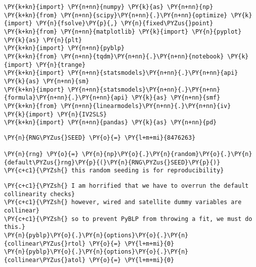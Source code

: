 
    \begin{tcolorbox}[breakable, size=fbox, boxrule=1pt, pad at break*=1mm,colback=cellbackground, colframe=cellborder]
\begin{Verbatim}[commandchars=\\\{\}]
\PY{k+kn}{import} \PY{n+nn}{numpy} \PY{k}{as} \PY{n+nn}{np}
\PY{k+kn}{from} \PY{n+nn}{scipy}\PY{n+nn}{.}\PY{n+nn}{optimize} \PY{k}{import} \PY{n}{fsolve}\PY{p}{,} \PY{n}{fixed\PYZus{}point}
\PY{k+kn}{from} \PY{n+nn}{matplotlib} \PY{k}{import} \PY{n}{pyplot} \PY{k}{as} \PY{n}{plt}
\PY{k+kn}{import} \PY{n+nn}{pyblp}
\PY{k+kn}{from} \PY{n+nn}{tqdm}\PY{n+nn}{.}\PY{n+nn}{notebook} \PY{k}{import} \PY{n}{trange}
\PY{k+kn}{import} \PY{n+nn}{statsmodels}\PY{n+nn}{.}\PY{n+nn}{api} \PY{k}{as} \PY{n+nn}{sm}
\PY{k+kn}{import} \PY{n+nn}{statsmodels}\PY{n+nn}{.}\PY{n+nn}{formula}\PY{n+nn}{.}\PY{n+nn}{api} \PY{k}{as} \PY{n+nn}{smf}
\PY{k+kn}{from} \PY{n+nn}{linearmodels}\PY{n+nn}{.}\PY{n+nn}{iv} \PY{k}{import} \PY{n}{IV2SLS}
\PY{k+kn}{import} \PY{n+nn}{pandas} \PY{k}{as} \PY{n+nn}{pd}
\end{Verbatim}
\end{tcolorbox}

    \begin{tcolorbox}[breakable, size=fbox, boxrule=1pt, pad at break*=1mm,colback=cellbackground, colframe=cellborder]
\begin{Verbatim}[commandchars=\\\{\}]
\PY{n}{RNG\PYZus{}SEED} \PY{o}{=} \PY{l+m+mi}{8476263}

\PY{n}{rng} \PY{o}{=} \PY{n}{np}\PY{o}{.}\PY{n}{random}\PY{o}{.}\PY{n}{default\PYZus{}rng}\PY{p}{(}\PY{n}{RNG\PYZus{}SEED}\PY{p}{)} \PY{c+c1}{\PYZsh{} this random seeding is for reproducibility}
\end{Verbatim}
\end{tcolorbox}

    \begin{tcolorbox}[breakable, size=fbox, boxrule=1pt, pad at break*=1mm,colback=cellbackground, colframe=cellborder]
\begin{Verbatim}[commandchars=\\\{\}]
\PY{c+c1}{\PYZsh{} I am horrified that we have to overrun the default collinearity checks}
\PY{c+c1}{\PYZsh{} however, wired and satellite dummy variables are collinear}
\PY{c+c1}{\PYZsh{} so to prevent PyBLP from throwing a fit, we must do this.}
\PY{n}{pyblp}\PY{o}{.}\PY{n}{options}\PY{o}{.}\PY{n}{collinear\PYZus{}rtol} \PY{o}{=} \PY{l+m+mi}{0}
\PY{n}{pyblp}\PY{o}{.}\PY{n}{options}\PY{o}{.}\PY{n}{collinear\PYZus{}atol} \PY{o}{=} \PY{l+m+mi}{0}
\end{Verbatim}
\end{tcolorbox}

